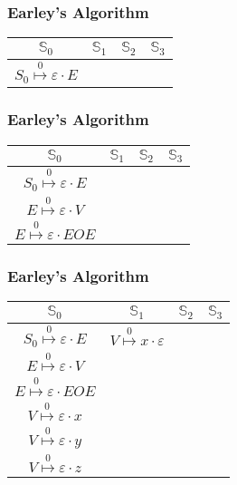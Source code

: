 \documentclass{beamer}
\newcommand{\earley}[4]{#1\overset{#4}{\mapsto}#2\cdot#3}
\newcommand{\St}[1]{\mathbb{S}_{#1}}
\begin{document}
	\begin{frame}
		\frametitle{Earley's Algorithm}
		\centering
		\begin{tabular}{|c|c|c|c|}
			\hline
			$\St{0}$ & $\St{1}$ & $\St{2}$ & $\St{3}$ \\
			\hline
			$\earley{S_0}{\varepsilon}{E}{0}$ & & & \\
			\hline
		\end{tabular}
	\end{frame}

	\begin{frame}
		\frametitle{Earley's Algorithm}
		\centering
		\begin{tabular}{|c|c|c|c|}
			\hline
			$\St{0}$ & $\St{1}$ & $\St{2}$ & $\St{3}$ \\
			\hline
			$\earley{S_0}{\varepsilon}{E}{0}$ & & & \\
			$\earley{E}{\varepsilon}{V}{0}$   & & & \\
			$\earley{E}{\varepsilon}{EOE}{0}$ & & & \\
			\hline
		\end{tabular}
	\end{frame}

	\begin{frame}
		\frametitle{Earley's Algorithm}
		\centering
		\begin{tabular}{|c|c|c|c|}
			\hline
			$\St{0}$                          & $\St{1}$ & $\St{2}$ & $\St{3}$ \\
			\hline
			$\earley{S_0}{\varepsilon}{E}{0}$ & $\earley{V}{x}{\varepsilon}{0}$ & &\\
			$\earley{E}{\varepsilon}{V}{0}$   & & & \\
			$\earley{E}{\varepsilon}{EOE}{0}$ & & & \\
			$\earley{V}{\varepsilon}{x}{0}$   & & & \\
			$\earley{V}{\varepsilon}{y}{0}$   & & & \\
			$\earley{V}{\varepsilon}{z}{0}$   & & & \\
			\hline
		\end{tabular}
	\end{frame}
\end{document}
